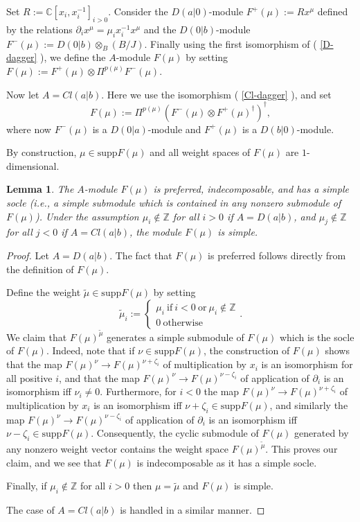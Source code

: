 \documentclass[12pt]{amsart}
\makeatletter
\def\@putname#1#2#3#4{\def\@@ref{#3}\let\old@bf\bf
        \def\bf##1{\old@bf\if?\noexpand##1?{#4}\else##1\fi}%
	#1{#2}%
        \let\bf\old@bf}
\def\@putname#1#2#3#4{\def\@@ref{#3}\let\old@bf\bf	%
	\let\old@reset@font\reset@font			%
        \def\bf##1{\old@bf\if?\noexpand##1?{#4}\else##1\fi}%
	\def\reset@font##1##2{\old@reset@font##1\if?\noexpand##2?{#4}\else##2\fi}#1{#2}%
        \let\bf\old@bf\let\reset@font\old@reset@font}
\let\my@ref=\ref
\def\ref#1{\@putname\my@ref{#1}{#1}{\tiny\rm\@@ref}}
\theoremstyle{plain} %
\numberwithin{equation}{section}
\theoremstyle{definition}
\theoremstyle{remark}
\theoremstyle{plain} %
\newtheorem{lemma}[definition]{Lemma}
\newcommand{\supp}{\mathrm{supp}}
\makeatother
\begin{document}
Set
$R:=\mathbb C[x_i,x_i^{-1}]_{i>0}$. Consider the $D(a|0)$-module 
$F^+(\mu):=Rx^\mu$ defined by the relations $\partial_ix^\mu=\mu_ix_i^{-1}x^{\mu}$ and the $D(0|b)$-module $F^-(\mu):=D(0|b)\otimes_B(B/J)$. Finally using the first isomorphism of (\ref{D-dagger}), we define the $A$-module $F(\mu)$ by setting
$F(\mu):=F^+(\mu)\otimes \Pi^{p(\mu)} F^-(\mu)$.


Now let $A=Cl(a|b)$. Here we use the isomorphism (\ref{Cl-dagger}), and set
$$F(\mu):= \Pi^{p(\mu)} (F^-(\mu)\otimes F^+(\mu)^\dagger)^\dagger,$$
where now $F^-(\mu)$ is a $D(0|a)$-module  and  $F^+(\mu)$ is a $D(b|0)$-module.

By construction, $\mu\in\supp F(\mu)$ and all weight spaces of $F(\mu)$ are $1$-dimensional.



\begin{lemma}\label{indecomposable} The $A$-module $F(\mu)$  is preferred, indecomposable, and has a simple socle (i.e., a simple submodule which is contained in any
  nonzero submodule of $F(\mu)$). Under the assumption  $\mu_i\notin \mathbb Z$ for all $i>0$ if $A=D(a|b)$, and $\mu_j\notin \mathbb Z$ for all $j<0$ if $A=Cl(a|b)$, the module $F(\mu)$ is simple.
\end{lemma}
\begin{proof} 

Let $A=D(a|b)$. The fact that $F(\mu)$  is preferred follows directly from the definition of  $F(\mu)$.

Define the weight $\tilde{\mu} \in\supp F(\mu)$ by setting
  $$\tilde{\mu}_i:=\begin{cases}\mu_i\ \text{if}\ i<0\ \text {or}\ \mu_i\not\in\mathbb Z\\ 0\ \text{otherwise} \end{cases}.$$
  We claim that $F(\mu)^{\tilde{\mu}}$ generates a  simple submodule of $F(\mu)$ which is the socle of  $F(\mu)$. Indeed, note that if $\nu \in\supp F(\mu)$, the construction of $F(\mu)$
  shows that  the map $F(\mu)^\nu\to F(\mu)^{\nu+\zeta_i}$  of multiplication by $x_i$ is an isomorphism for all positive $i$, and that
  the map $F(\mu)^\nu\to F(\mu)^{\nu-\zeta_i}$ of application of  $\partial_i$
  is an isomorphism iff
  $\nu_i\neq 0$. Furthermore, for $i<0$ the map $F(\mu)^\nu\to F(\mu)^{\nu+\zeta_i}$ of multiplication by $x_i$ is an isomorphism iff
  $\nu+\zeta_i\in \supp F(\mu)$, and similarly  the map $F(\mu)^\nu\to F(\mu)^{\nu-\zeta_i}$ of application of  $\partial_i$  is an isomorphism
  iff $ \nu-\zeta_i \in \supp F(\mu)$. Consequently, the cyclic submodule of $F(\mu)$ generated  by any nonzero weight vector contains the weight space $F(\mu)^{\tilde{\mu}}$.  This proves our claim, and we see that $F(\mu)$ is  indecomposable as it has a simple socle.

  
  Finally, if $\mu_i\notin \mathbb Z$ for all $i>0$ then  $\mu=\tilde\mu$ and  $F(\mu)$ is simple. 
  
  The case of  $A=Cl(a|b)$ is handled in a similar manner. 
  \end{proof}
  
\end{document}
